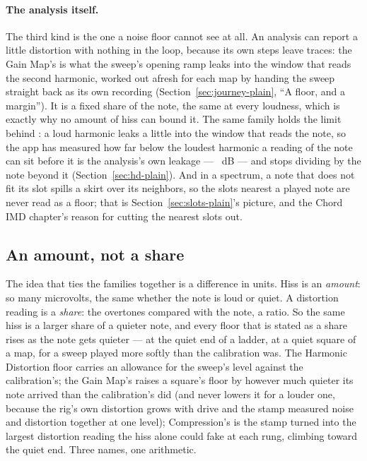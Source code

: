 \documentclass[11pt,a4paper]{article}
\begin{document}
\paragraph{The analysis itself.} The third kind is the one a noise floor
cannot see at all. An analysis can report a little distortion with
nothing in the loop, because its own steps leave traces: the Gain Map's
 is what the sweep's opening ramp leaks into the
window that reads the second harmonic, worked out afresh for each map by
handing the sweep straight back as its own recording
(Section~\ref{sec:journey-plain}, ``A floor, and a margin''). It is a
fixed share of the note, the same at every loudness, which is exactly why
no amount of hiss can bound it. The same family holds the limit behind
: a loud harmonic leaks a little into the
window that reads the note, so the app has measured how far below the
loudest harmonic a reading of the note can sit before it is the
analysis's own leakage --- \hdSeparationDB{}~dB --- and stops dividing
by the note beyond it (Section~\ref{sec:hd-plain}). And in a spectrum, a
note that does not fit its slot spills a skirt over its neighbors, so
the slots nearest a played note are never read as a floor; that is
Section~\ref{sec:slots-plain}'s picture, and the Chord IMD chapter's
reason for cutting the nearest slots out.

\subsection{An amount, not a share}

The idea that ties the families together is a difference in units. Hiss
is an \emph{amount}: so many microvolts, the same whether the note is
loud or quiet. A distortion reading is a \emph{share}: the overtones
compared with the note, a ratio. So the same hiss is a larger share of a
quieter note, and every floor that is stated as a share rises as the note
gets quieter --- at the quiet end of a ladder, at a quiet square of a map,
for a sweep played more softly than the calibration was. The Harmonic
Distortion floor carries an allowance for the sweep's level against the
calibration's; the Gain Map's  raises a square's floor
by however much quieter its note arrived than the calibration's did
(and never lowers it for a louder one, because the rig's own distortion
grows with drive and the stamp measured noise and distortion together at
one level); Compression's  is the stamp turned into
the largest distortion reading the hiss alone could fake at each rung,
climbing toward the quiet end. Three names, one arithmetic.
\end{document}
